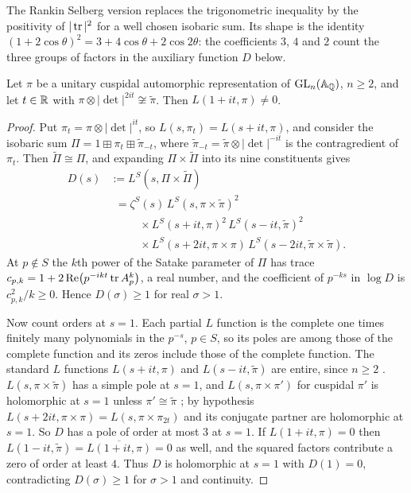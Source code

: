 The Rankin Selberg version replaces the trigonometric inequality by the positivity of $|\operatorname{tr}|^2$ for a well chosen isobaric sum. Its shape is the identity $(1+2\cos\theta)^2 = 3 + 4\cos\theta + 2\cos 2\theta$: the coefficients $3$, $4$ and $2$ count the three groups of factors in the auxiliary function $D$ below.

\begin{proposition}\label{prop:ch09nonvanish}
Let $\pi$ be a unitary cuspidal automorphic representation of $\mathrm{GL}_n(\mathbb{A}_{\mathbb{Q}})$, $n\ge 2$, and let $t\in\mathbb{R}$ with $\pi\otimes|\det|^{2it}\not\cong\tilde\pi$. Then $L(1+it,\pi)\ne 0$.
\end{proposition}

\begin{proof}
Put $\pi_t = \pi\otimes|\det|^{it}$, so $L(s,\pi_t) = L(s+it,\pi)$, and consider the isobaric sum $\Pi = 1\boxplus\pi_t\boxplus\tilde\pi_{-t}$, where $\tilde\pi_{-t} = \tilde\pi\otimes|\det|^{-it}$ is the contragredient of $\pi_t$. Then $\tilde\Pi\cong\Pi$, and expanding $\Pi\times\tilde\Pi$ into its nine constituents gives
\begin{align*}
D(s) &:= L^S(s,\Pi\times\tilde\Pi)\\
&\phantom{:}= \zeta^S(s)\,L^S(s,\pi\times\tilde\pi)^2\\
&\phantom{:=}\quad\times L^S(s+it,\pi)^2\,L^S(s-it,\tilde\pi)^2\\
&\phantom{:=}\quad\times L^S(s+2it,\pi\times\pi)\,L^S(s-2it,\tilde\pi\times\tilde\pi).
\end{align*}
At $p\notin S$ the $k$th power of the Satake parameter of $\Pi$ has trace $c_{p,k} = 1 + 2\operatorname{Re}\bigl(p^{-ikt}\operatorname{tr} A_p^k\bigr)$, a real number, and the coefficient of $p^{-ks}$ in $\log D$ is $c_{p,k}^2/k\ge 0$. Hence $D(\sigma)\ge 1$ for real $\sigma>1$.

Now count orders at $s=1$. Each partial $L$ function is the complete one times finitely many polynomials in the $p^{-s}$, $p\in S$, so its poles are among those of the complete function and its zeros include those of the complete function. The standard $L$ functions $L(s+it,\pi)$ and $L(s-it,\tilde\pi)$ are entire, since $n\ge2$ \cite{godementjacquet1972}. $L(s,\pi\times\tilde\pi)$ has a simple pole at $s=1$, and $L(s,\pi\times\pi')$ for cuspidal $\pi'$ is holomorphic at $s=1$ unless $\pi'\cong\tilde\pi$ \cite{jacquetshalika1981}; by hypothesis $L(s+2it,\pi\times\pi) = L(s,\pi\times\pi_{2t})$ and its conjugate partner are holomorphic at $s=1$. So $D$ has a pole of order at most $3$ at $s=1$. If $L(1+it,\pi)=0$ then $L(1-it,\tilde\pi) = \overline{L(1+it,\pi)} = 0$ as well, and the squared factors contribute a zero of order at least $4$. Thus $D$ is holomorphic at $s=1$ with $D(1)=0$, contradicting $D(\sigma)\ge1$ for $\sigma>1$ and continuity.
\end{proof}

